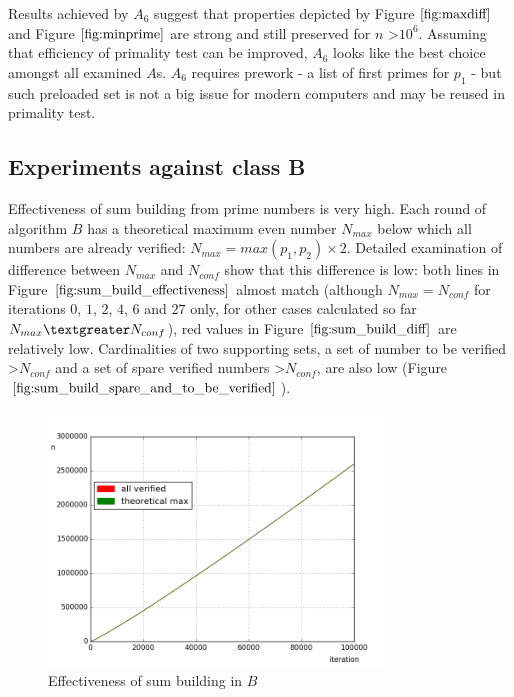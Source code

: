 \documentclass[10pt,twocolumn]{article}
\begin{document}
Results achieved by $A_6$ suggest that properties depicted by Figure $\ref{fig:maxdiff}$ and Figure $\ref{fig:minprime}$ are strong and still preserved for $n$ \textgreater $10^6$. Assuming that efficiency of primality test can be improved, $A_6$ looks like the best choice amongst all examined $A$s. $A_6$ requires prework - a list of first primes for $p_1$ - but such preloaded set is not a big issue for modern computers and may be reused in primality test.

\subsection{Experiments against class B}

Effectiveness of sum building from prime numbers is very high. Each round of algorithm $B$ has a theoretical maximum even number $N_{max}$ below which all numbers are already verified: $N_{max} = max(p_1, p_2) \times 2$. Detailed examination of difference between $N_{max}$ and $N_{conf}$ show that this difference is low: both lines in Figure $\ref{fig:sum_build_effectiveness}$ almost match (although $N_{max} = N_{conf}$ for iterations $0$, $1$, $2$, $4$, $6$ and $27$ only, for other cases calculated so far $N_{max} \textgreater N_{conf}$), red values in Figure $\ref{fig:sum_build_diff}$ are relatively low. Cardinalities of two supporting sets, a set of number to be verified \textgreater $N_{conf}$ and a set of spare verified numbers \textgreater $N_{conf}$, are also low (Figure $\ref{fig:sum_build_spare_and_to_be_verified}$). \par

\begin{figure}[!ht]
\centering
\includegraphics[width=9cm]{f_sum_build_effectiveness}
\caption{Effectiveness of sum building in $B$}
\label{fig:sum_build_effectiveness}
\end{figure}
\end{document}
